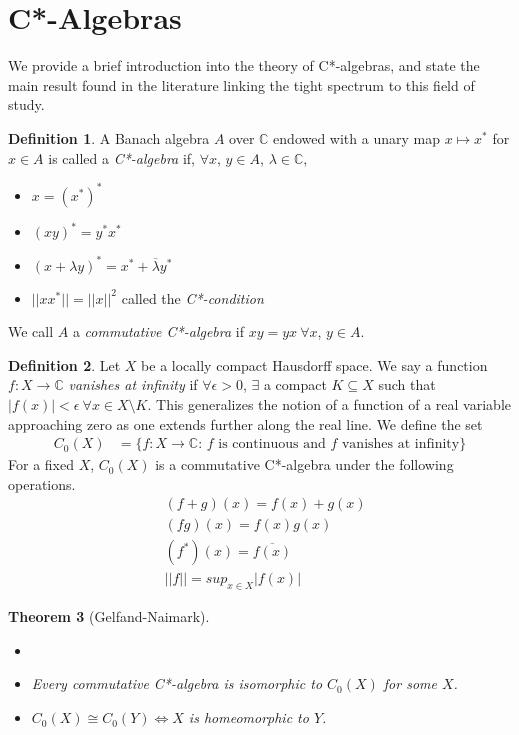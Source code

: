 \documentclass[12pt]{article}
\newtheorem{theorem}{Theorem}[section]
\theoremstyle{definition}
\newtheorem{definition}[theorem]{Definition}
\begin{document}
\section{C*-Algebras}
We provide a brief introduction into the theory of C*-algebras, and state
the main result found in the literature linking the tight spectrum to this field of study. 

\begin{definition}
    A Banach algebra $A$ over $\mathbb{C}$ endowed with a unary map $x \mapsto x^*$ for $x \in A$
    is called a \emph{C*-algebra} if, $\forall x$, $y \in A$, $\lambda \in \mathbb{C}$,
    \begin{itemize}
        \item $x = (x^*)^*$
        \item $(xy)^* = y^*x^*$
        \item $(x + \lambda y)^* = x^* + \overline{\lambda} y^*$
        \item $||xx^*|| = ||x||^2$ \quad called the \emph{C*-condition}
    \end{itemize}
    We call $A$ a \emph{commutative C*-algebra} if $xy = yx \ \forall x$, $y \in A$.
\end{definition}

\begin{definition}
    Let $X$ be a locally compact Hausdorff space. We say a function $f: X \to \mathbb{C}$
    \emph{vanishes at infinity} if $\forall \epsilon > 0$, $\exists$ a compact $K \subseteq X$
    such that $|f(x)| < \epsilon \ \forall x \in X \setminus K$. This generalizes the notion of
    a function of a real variable approaching zero as one extends further along the real line. We define the set
    \begin{align*}
        C_0(X) &= \{f: X \to \mathbb{C}\text{: $f$ is continuous and $f$ vanishes at infinity}\}
    \end{align*}
    For a fixed $X$, $C_0(X)$ is a commutative C*-algebra under the following operations.
    \begin{align*}
        &(f+g)(x) = f(x) + g(x) \\
        &(fg)(x) = f(x)g(x) \\
        &(f^*)(x) = \overline{f(x)} \\
        &||f|| = sup_{x \in X} |f(x)|
    \end{align*}
\end{definition}

\begin{theorem}[Gelfand-Naimark]
    \begin{itemize}
        \item[]
        \item Every commutative C*-algebra is isomorphic to $C_0(X)$ for some $X$.
        \item $C_0(X) \cong C_0(Y) \iff X$ is homeomorphic to $Y$.
    \end{itemize}
\end{theorem}
\end{document}
